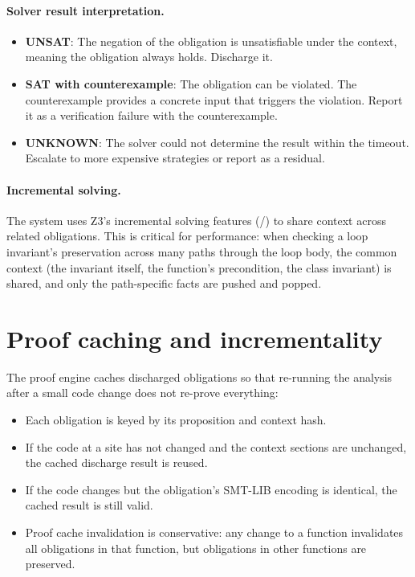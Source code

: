 \documentclass[11pt]{report}
\DeclareRobustCommand{\py}[1]{\texttt{\detokenize{#1}}}
\theoremstyle{definition}
\theoremstyle{plain}
\begin{document}
\paragraph{Solver result interpretation.}
\begin{itemize}[nosep]
  \item \textbf{UNSAT}: The negation of the obligation is unsatisfiable under
        the context, meaning the obligation always holds. Discharge it.
  \item \textbf{SAT with counterexample}: The obligation can be violated.
        The counterexample provides a concrete input that triggers the
        violation. Report it as a verification failure with the
        counterexample.
  \item \textbf{UNKNOWN}: The solver could not determine the result within
        the timeout. Escalate to more expensive strategies or report as a
        residual.
\end{itemize}

\paragraph{Incremental solving.}
The system uses Z3's incremental solving features (\py{push()}/\py{pop()}) to
share context across related obligations. This is critical for performance:
when checking a loop invariant's preservation across many paths through the
loop body, the common context (the invariant itself, the function's
precondition, the class invariant) is shared, and only the path-specific
facts are pushed and popped.

\section{Proof caching and incrementality}

The proof engine caches discharged obligations so that re-running the analysis
after a small code change does not re-prove everything:

\begin{itemize}[nosep]
  \item Each obligation is keyed by its proposition and context hash.
  \item If the code at a site has not changed and the context sections are
        unchanged, the cached discharge result is reused.
  \item If the code changes but the obligation's SMT-LIB encoding is
        identical, the cached result is still valid.
  \item Proof cache invalidation is conservative: any change to a function
        invalidates all obligations in that function, but obligations in
        other functions are preserved.
\end{itemize}
\end{document}
